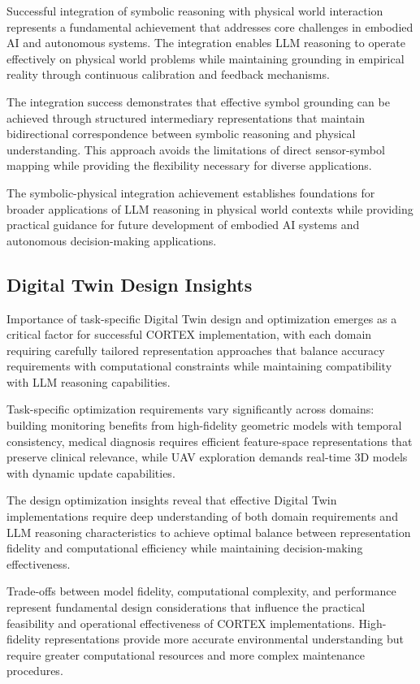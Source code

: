 Successful integration of symbolic reasoning with physical world interaction represents a fundamental achievement that addresses core challenges in embodied AI and autonomous systems. The integration enables LLM reasoning to operate effectively on physical world problems while maintaining grounding in empirical reality through continuous calibration and feedback mechanisms.

The integration success demonstrates that effective symbol grounding can be achieved through structured intermediary representations that maintain bidirectional correspondence between symbolic reasoning and physical understanding. This approach avoids the limitations of direct sensor-symbol mapping while providing the flexibility necessary for diverse applications.

The symbolic-physical integration achievement establishes foundations for broader applications of LLM reasoning in physical world contexts while providing practical guidance for future development of embodied AI systems and autonomous decision-making applications.

\subsection{Digital Twin Design Insights}

Importance of task-specific Digital Twin design and optimization emerges as a critical factor for successful CORTEX implementation, with each domain requiring carefully tailored representation approaches that balance accuracy requirements with computational constraints while maintaining compatibility with LLM reasoning capabilities.

Task-specific optimization requirements vary significantly across domains: building monitoring benefits from high-fidelity geometric models with temporal consistency, medical diagnosis requires efficient feature-space representations that preserve clinical relevance, while UAV exploration demands real-time 3D models with dynamic update capabilities.

The design optimization insights reveal that effective Digital Twin implementations require deep understanding of both domain requirements and LLM reasoning characteristics to achieve optimal balance between representation fidelity and computational efficiency while maintaining decision-making effectiveness.

Trade-offs between model fidelity, computational complexity, and performance represent fundamental design considerations that influence the practical feasibility and operational effectiveness of CORTEX implementations. High-fidelity representations provide more accurate environmental understanding but require greater computational resources and more complex maintenance procedures.

